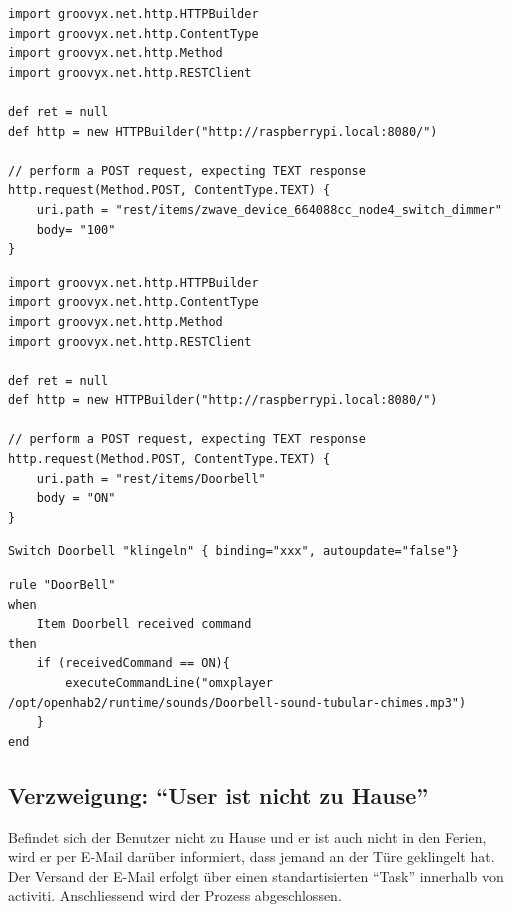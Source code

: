 \begin{lstlisting}[caption={Groovy-Script zum Einschalten des Lichts},label={lst:analyse:gr:light}] 
import groovyx.net.http.HTTPBuilder
import groovyx.net.http.ContentType
import groovyx.net.http.Method
import groovyx.net.http.RESTClient

def ret = null
def http = new HTTPBuilder("http://raspberrypi.local:8080/")

// perform a POST request, expecting TEXT response
http.request(Method.POST, ContentType.TEXT) {
    uri.path = "rest/items/zwave_device_664088cc_node4_switch_dimmer"
    body= "100"
}
\end{lstlisting}


\begin{lstlisting}[caption={Groovy-Script zum Start der akkustischen "`Türklingel"' Ausgabe}]
import groovyx.net.http.HTTPBuilder
import groovyx.net.http.ContentType
import groovyx.net.http.Method
import groovyx.net.http.RESTClient

def ret = null
def http = new HTTPBuilder("http://raspberrypi.local:8080/")

// perform a POST request, expecting TEXT response
http.request(Method.POST, ContentType.TEXT) {
    uri.path = "rest/items/Doorbell"
    body = "ON"
}
\end{lstlisting}

\begin{lstlisting}[caption={Item-Definition für die "`Virtuelle Türklingel"'},label={lst:analyse:item:doorbell}]
Switch Doorbell "klingeln" { binding="xxx", autoupdate="false"}
\end{lstlisting}

\begin{lstlisting}[caption={Item-Regel für die "`Virtuelle Türklingel"'},label={lst:analyse:rule:doorbell}]
rule "DoorBell"
when
	Item Doorbell received command
then
	if (receivedCommand == ON){
		executeCommandLine("omxplayer /opt/openhab2/runtime/sounds/Doorbell-sound-tubular-chimes.mp3")
	}
end

\end{lstlisting}

\subsection{Verzweigung: "`User ist nicht zu Hause"'}
Befindet sich der Benutzer nicht zu Hause und er ist auch nicht in den Ferien, wird er per E-Mail darüber informiert, dass jemand an der Türe geklingelt hat. Der Versand der E-Mail erfolgt über einen standartisierten "`Task"' innerhalb von activiti. Anschliessend wird der Prozess abgeschlossen.


